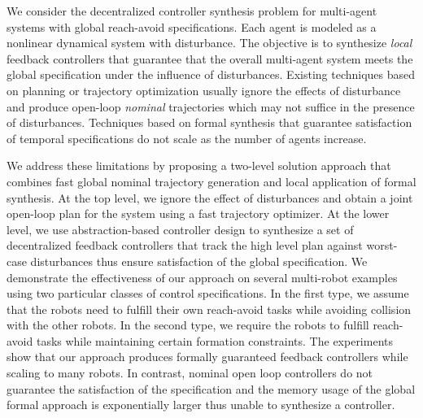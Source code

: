 
We consider the decentralized controller synthesis problem for multi-agent systems with global reach-avoid specifications.
Each agent is modeled as a nonlinear dynamical system with disturbance. The objective is to synthesize \emph{local} feedback controllers that guarantee that the overall multi-agent system meets the global specification under the influence of disturbances.
%
Existing techniques based on planning or trajectory optimization usually ignore the effects of disturbance and produce open-loop
\emph{nominal} trajectories which may not suffice in the presence of disturbances.
Techniques based on formal synthesis that guarantee satisfaction of temporal specifications do not scale as the number of agents increase.

We address these limitations by proposing a two-level solution approach that combines fast global nominal trajectory generation and local application of formal synthesis.
At the top level, we ignore the effect of disturbances and obtain a joint open-loop plan for the system using a fast trajectory optimizer.
At the lower level, we use abstraction-based controller design to synthesize a set of decentralized feedback controllers 
that track the high level plan against worst-case disturbances thus ensure satisfaction of the global specification.
We demonstrate the effectiveness of our approach on several multi-robot examples using two particular classes of control specifications.
In the first type, we assume that the robots need to fulfill their own reach-avoid tasks while avoiding collision with the other robots.
In the second type, we require the robots to fulfill reach-avoid tasks while maintaining certain formation constraints.
The experiments show that our approach produces formally guaranteed feedback controllers while scaling to many robots.
In contrast, nominal open loop controllers do not guarantee the satisfaction of the specification and the memory usage of the global formal approach is exponentially larger thus unable to synthesize a controller.
